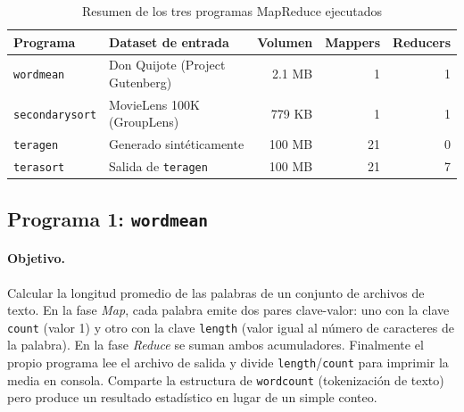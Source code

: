 
\begin{table}[H]
\centering
\caption{Resumen de los tres programas MapReduce ejecutados}
\label{tab:hadoop-resumen}
\vspace{0.2cm}
\small
\begin{tabular}{@{}llrrr@{}}
\toprule
\textbf{Programa} & \textbf{Dataset de entrada} & \textbf{Volumen} & \textbf{Mappers} & \textbf{Reducers} \\
\midrule
\texttt{wordmean}      & Don Quijote (Project Gutenberg) & 2.1 MB    & 1  & 1 \\
\texttt{secondarysort} & MovieLens 100K (GroupLens)      & 779 KB    & 1  & 1 \\
\texttt{teragen}       & Generado sintéticamente         & 100 MB    & 21 & 0 \\
\texttt{terasort}      & Salida de \texttt{teragen}      & 100 MB    & 21 & 7 \\
\bottomrule
\end{tabular}
\end{table}

\subsection{Programa 1: \texttt{wordmean}}

\paragraph{Objetivo.} Calcular la longitud promedio de las palabras de un conjunto de archivos de texto. En la fase \textit{Map}, cada palabra emite dos pares clave-valor: uno con la clave \texttt{count} (valor 1) y otro con la clave \texttt{length} (valor igual al número de caracteres de la palabra). En la fase \textit{Reduce} se suman ambos acumuladores. Finalmente el propio programa lee el archivo de salida y divide \texttt{length}/\texttt{count} para imprimir la media en consola. Comparte la estructura de \texttt{wordcount} (tokenización de texto) pero produce un resultado estadístico en lugar de un simple conteo.

